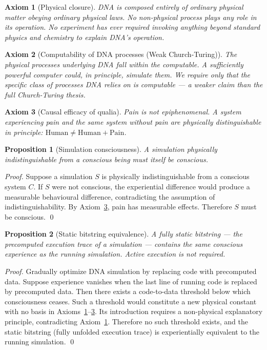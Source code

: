 \documentclass[12pt,a4paper]{article}
\newtheorem{axiom}{Axiom}
\newtheorem{proposition}{Proposition}
\begin{document}
\begin{axiom}[Physical closure]
\label{ax:closure}
DNA is composed entirely of ordinary physical matter obeying ordinary physical
laws. No non-physical process plays any role in its operation. No experiment
has ever required invoking anything beyond standard physics and chemistry to
explain DNA's operation.
\end{axiom}

\begin{axiom}[Computability of DNA processes (Weak Church-Turing)]
\label{ax:compute}
The physical processes underlying DNA fall within the computable. A
sufficiently powerful computer could, in principle, simulate them. We require
only that the specific class of processes DNA relies on is computable --- a
weaker claim than the full Church-Turing thesis.
\end{axiom}

\begin{axiom}[Causal efficacy of qualia]
\label{ax:qualia}
Pain is not epiphenomenal. A system experiencing pain and the same system
without pain are physically distinguishable in principle:
$\mathrm{Human} \neq \mathrm{Human} + \mathrm{Pain}$.
\end{axiom}

\begin{proposition}[Simulation consciousness]
\label{prop:sim}
A simulation physically indistinguishable from a conscious being must itself
be conscious.
\end{proposition}

\begin{proof}
Suppose a simulation $S$ is physically indistinguishable from a conscious
system $C$. If $S$ were not conscious, the experiential difference would
produce a measurable behavioural difference, contradicting the assumption of
indistinguishability. By Axiom~\ref{ax:qualia}, pain has measurable effects.
Therefore $S$ must be conscious. \qed
\end{proof}

\begin{proposition}[Static bitstring equivalence]
\label{prop:static}
A fully static bitstring --- the precomputed execution trace of a simulation
--- contains the same conscious experience as the running simulation. Active
execution is not required.
\end{proposition}

\begin{proof}
Gradually optimize DNA simulation by replacing code with precomputed data.
Suppose experience vanishes when the last line of running code is replaced by
precomputed data. Then there exists a code-to-data threshold below which
consciousness ceases. Such a threshold would constitute a new physical constant
with no basis in Axioms~\ref{ax:closure}--\ref{ax:qualia}. Its introduction
requires a non-physical explanatory principle, contradicting
Axiom~\ref{ax:closure}. Therefore no such threshold exists, and the static
bitstring (fully unfolded execution trace) is experientially equivalent to the
running simulation. \qed
\end{proof}
\end{document}
